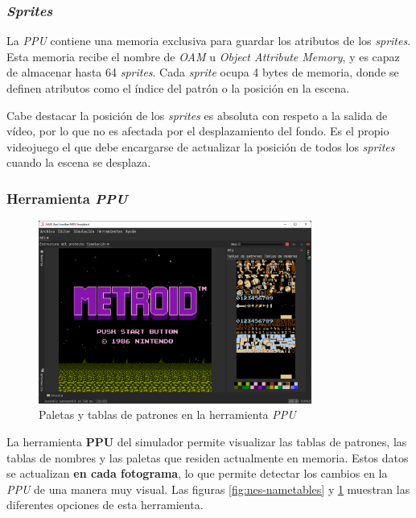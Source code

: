 \subsubsection{\textit{Sprites}}\label{subsubsec:sprites}

La \textit{PPU} contiene una memoria exclusiva para guardar
los atributos de los \textit{sprites}.
Esta memoria recibe el nombre de \textit{OAM} u \textit{Object Attribute Memory}\cite{OAM},
y es capaz de almacenar hasta 64 \textit{sprites}.
Cada \textit{sprite} ocupa 4 bytes de memoria, donde se
definen atributos como el índice del patrón o la posición en la escena.

Cabe destacar la posición de los \textit{sprites} es
absoluta con respeto a la salida de vídeo, por lo que no
es afectada por el desplazamiento del fondo.
Es el propio videojuego el que debe encargarse
de actualizar la posición de todos los \textit{sprites}
cuando la escena se desplaza.

\subsubsection{Herramienta \textit{PPU}}

\begin{figure}[h]
    \centering
    \includegraphics[width=0.8\textwidth]{images/nes/nes-patterntables}
    \caption{Paletas y tablas de patrones en la herramienta \textit{PPU}}
    \label{fig:nes-patterntables}
\end{figure}

La herramienta \textbf{PPU} del simulador permite
visualizar las tablas de patrones, las tablas de nombres
y las paletas que residen actualmente en memoria.
Estos datos se actualizan \textbf{en cada fotograma},
lo que permite detectar los cambios en la \textit{PPU}
de una manera muy visual.
Las figuras \ref{fig:nes-nametables} y \ref{fig:nes-patterntables}
muestran las diferentes opciones de esta herramienta.

